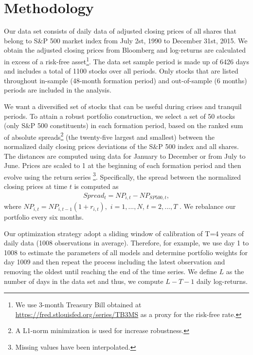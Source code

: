\documentclass[a4paper,12pt]{report}
\begin{document}
\vspace{0.6cm}

\section{Methodology}

Our data set consists of daily data of adjusted closing prices of all shares
that belong to S\&P 500 market index from July 2st, 1990 to December 31st,
2015. We obtain the adjusted closing prices from Bloomberg and
log-returns are calculated in excess of a risk-free asset\footnote{%
	We use 3-month Treasury Bill obtained at %
	\url{https://fred.stlouisfed.org/series/TB3MS} as a proxy for the risk-free
	rate.}. The data set sample period is made up of 6426 days and includes a
total of 1100 stocks over all periods. Only stocks that are listed
throughout in-sample (48-month formation period) and out-of-sample (6
months) periods are included in the analysis.

We want a diversified set of stocks that can be useful during crises and
tranquil periods. To attain a robust portfolio construction, we select a set of 50 stocks (only S\&P 500 constituents) in
each formation period, based on the ranked sum of absolute spreads\footnote{A L1-norm minimization is used for increase robustness.} (the twenty-five largest and smallest) between the normalized
daily closing prices deviations of the
S\&P 500 index and all shares. The distances are computed using data for January
to December or from July to June. Prices are scaled to 1 at the beginning of
each formation period and then evolve using the return series \footnote{%
	Missing values have been interpolated.}. Specifically, the spread between
the normalized closing prices at time $t$ is computed as
\begin{equation}
\begin{aligned} Spread_{t}=NP_{i,t}-NP_{SP500,t}, \end{aligned}
\label{eq:eq01}
\end{equation}%
where $NP_{i,t}=NP_{i,t-1}\left( 1+r_{i,t}\right) ,$ $i=1,...,N$, $t=2,...,T$%
. We rebalance our portfolio every six months.

Our optimization strategy adopt a sliding window of calibration of T=4 years of daily data (1008 observations in average). Therefore, for example, we use day 1 to 1008 to
estimate the parameters of all models and determine portfolio weights for
day 1009 and then repeat the process including the latest observation and
removing the oldest until reaching the end of the time series. We define $L$
as the number of days in the data set and thus, we compute $L-T-1$ daily
log-returns.
\end{document}
